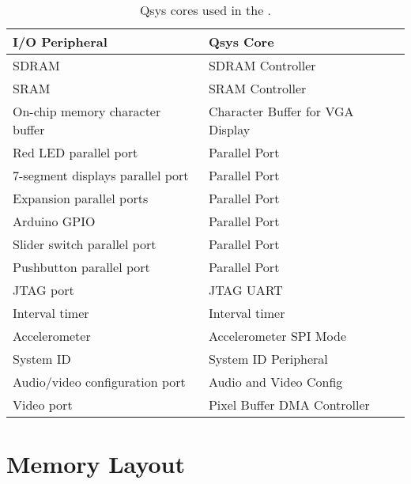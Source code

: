 
\begin{table}[h]
    \begin{center}
    \begin{tabular}{l|l}
            \textbf{I/O Peripheral}
            & \textbf{Qsys Core}
        \\\hline
            SDRAM
            & SDRAM Controller
        \\
            SRAM
        &   SRAM Controller
        \\
            On-chip memory character buffer
				& Character Buffer for VGA Display
        \\
            Red LED parallel port
				& Parallel Port
        \\
            7-segment displays parallel port
				& Parallel Port
        \\
            Expansion parallel ports
				& Parallel Port
        \\
						Arduino GPIO
				& Parallel Port
				\\
            Slider switch parallel port
				& Parallel Port
        \\
            Pushbutton parallel port
				& Parallel Port
        \\
            JTAG port
				& JTAG UART
        \\
            Interval timer
				& Interval timer 
				\\
						Accelerometer
			  & Accelerometer SPI Mode
				\\
						System ID
				& System ID Peripheral
        \\
            Audio/video configuration port
				& Audio and Video Config
        \\
            Video port
				& Pixel Buffer DMA Controller
        \\
    \end{tabular}
    \caption{Qsys cores used in the \systemName.}
    \label{tab:sopcnames}
    \end{center}
\end{table}

\clearpage


\section{Memory Layout}

